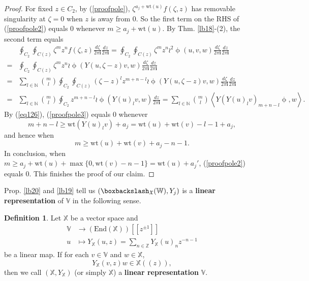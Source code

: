 \documentclass[11pt,b5paper,notitlepage]{article}
\theoremstyle{definition}
\newtheorem{df}{Definition}[subsection]
\theoremstyle{plain}
\newcommand{\End}{\mathrm{End}} %
\newcommand{\im}{\mathbf{i}}
\newcommand{\Vbb}{\mathbb V}
\newcommand{\Xbb}{\mathbb X}
\newcommand{\Wbb}{\mathbb W}
\newcommand{\Nbb}{\mathbb N}
\newcommand{\Zbb}{\mathbb Z}
\newcommand{\wt}{\mathrm{wt}}
\newcommand{\<}{\left\langle}
\renewcommand{\>}{\right\rangle}
\newcommand{\fx}{\mathfrak{X}}
\numberwithin{equation}{subsection}
\begin{document}
\begin{proof}
        For fixed $z\in C_2$, by (\ref{proofpole}), $\zeta^{a_j+\wt(u)}f(\zeta,z)$ has removable singularity at $\zeta=0$ when $z$ is away from $0$. So the first term on the RHS of (\ref{proofpole2}) equals $0$ whenever $m\geq a_j+\wt(u)$. By Thm. \ref{lb18}-(2), the second term equals
        \begin{align}
&\oint_{C_2}\oint_{C(z)}\zeta^m z^n f(\zeta,z)\frac{d\zeta}{2\pi\im} \frac{dz}{2\pi\im} =\oint_{C_2}\oint_{C(z)}\zeta^m z^n \wr^2 \upphi(u,v,w)\frac{d\zeta}{2\pi\im} \frac{dz}{2\pi\im}  \nonumber\\
            =&\oint_{C_2}\oint_{C(z)}\zeta^m z^n \wr \upphi(Y(u,\zeta-z)v,w)\frac{d\zeta}{2\pi\im} \frac{dz}{2\pi\im}  \nonumber\\
            =&\sum_{l\in \Nbb}\binom{m}{l}\oint_{C_2}\oint_{C(z)}(\zeta-z)^l z^{m+n-l} \wr \upphi(Y(u,\zeta-z)v,w)\frac{d\zeta}{2\pi\im} \frac{dz}{2\pi\im}  \nonumber\\
            =&\sum_{l\in \Nbb}\binom{m}{l}\oint_{C_2} z^{m+n-l} \wr \upphi(Y(u)_lv,w) \frac{dz}{2\pi\im} =\sum_{l\in \Nbb}\binom{m}{l} \<Y(Y(u)_lv)_{m+n-l}\upphi,w\>.   \label{proofpole3}
        \end{align}
        By (\ref{eq126}), (\ref{proofpole3}) equals $0$ whenever
        $$
        m+n-l\geq \wt(Y(u)_lv)+a_j=\wt(u)+\wt(v)-l-1+a_j,
        $$
        and hence when 
        $$
        m\geq \wt(u)+\wt(v)+a_j-n-1.
        $$
        In conclusion, when $m\geq a_j+\wt(u)+\max\{0,\wt(v)-n-1\}=\wt(u)+a_j'$, (\ref{proofpole2}) equals $0$. This finishes the proof of our claim.
    \end{proof}





Prop. \ref{lb20} and  \ref{lb19} tell us $(\boxbackslash_\fx(\Wbb),Y_j)$ is a \textbf{linear representation} of $\Vbb$ in the following sense.


    \begin{df}
    Let $\Xbb$ be a vector space and
$$
\begin{aligned}
    \Vbb&\rightarrow (\End(\Xbb))[[z^{\pm 1}]]\\
    u&\mapsto Y_\Xbb(u,z)=\sum_{n\in \Zbb}Y_\Xbb(u)_nz^{-n-1}
\end{aligned}
$$
be a linear map. If for each $v\in \Vbb$ and $w\in \Xbb$, 
$$
Y_\Xbb(v,z)w\in \Xbb((z)),
$$
then we call $(\Xbb,Y_\Xbb)$ (or simply $\Xbb$) a \textbf{linear representation} $\Vbb$.
    \end{df}
\end{document}

